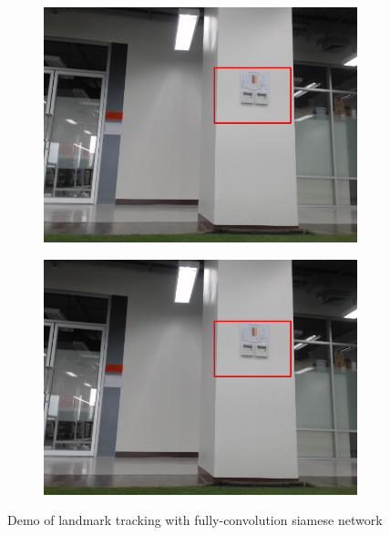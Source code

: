 \begin{figure}[H]
\begin{subfigure}{.2\textwidth}
			\includegraphics[width=\textwidth]{image/landmark/landmark4.png}
		\end{subfigure}
		\begin{subfigure}{.2\textwidth}
			\centering
			\includegraphics[width=\textwidth]{image/landmark/landmark5.png}
		\end{subfigure}
		\caption{ Demo of landmark tracking with fully-convolution siamese network }
		\label{fig:fig}
	\end{figure}
	
	